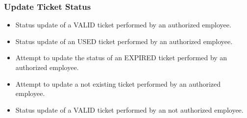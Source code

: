 \subsubsection{Update Ticket Status}
\begin{itemize}
	\item Status update of a VALID ticket performed by an authorized employee.
	\item Status update of an USED ticket performed by an authorized employee.
	\item Attempt to update the status of an EXPIRED ticket performed by an authorized employee.
	\item Attempt to update a not existing ticket performed by an authorized employee.
	\item Status update of a VALID ticket performed by an not authorized employee.
\end{itemize}

